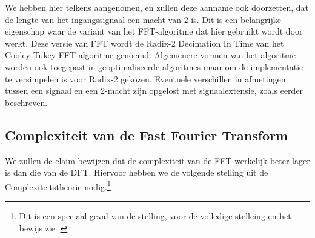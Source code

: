 \begin{opmerk}
We hebben hier telkens aangenomen, en zullen deze aanname ook doorzetten, 
dat de lengte van het ingangssignaal een macht van $2$ is. Dit is een belangrijke
eigenschap waar de variant van het FFT-algoritme dat hier gebruikt wordt door werkt. Deze versie van FFT wordt
de Radix-2 Decimation In Time van het Cooley-Tukey FFT algoritme genoemd. Algemenere vormen van het algoritme
worden ook toegepast in geoptimaliseerde algoritmes maar om de implementatie te versimpelen 
is voor Radix-2 gekozen. Eventuele verschillen in afmetingen tussen een signaal en 
een 2-macht zijn opgelost met signaalextensie, zoals eerder beschreven.
\end{opmerk}

\subsection{Complexiteit van de Fast Fourier Transform}
We zullen de claim bewijzen dat de complexiteit van de FFT werkelijk beter lager is dan die van de DFT.
Hiervoor hebben we de volgende stelling uit de Complexiteitstheorie nodig.\footnote{Dit is een speciaal geval van de stelling, voor de volledige stelleing en het bewijs zie \cite{akra-bazzi}.}


